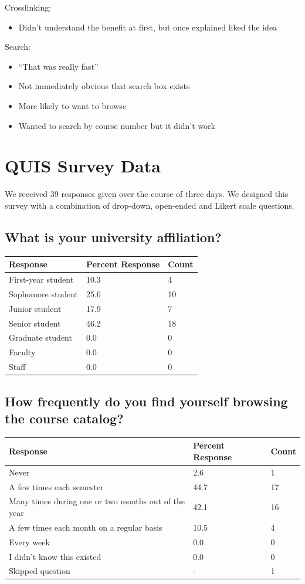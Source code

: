 \documentclass[12pt]{report}
\begin{document}
Crosslinking:
\begin{itemize}
\item Didn't understand the benefit at first, but once explained liked the idea
\end{itemize}
Search:
\begin{itemize}
\item ``That was really fast''
\item Not immediately obvious that search box exists
\item More likely to want to browse
\item Wanted to search by course number but it didn't work
\end{itemize}

\section{QUIS Survey Data}

We received 39 responses given over the course of three days. We designed this survey with a combination of drop-down, open-ended and Likert scale questions.

\subsection*{What is your university affiliation?}

\begin{tabular}{lll}
Response	&Percent Response	&Count \\
\hline
First-year student	&10.3	&4\\
Sophomore student	&25.6	&10\\
Junior student	&17.9	&7\\
Senior student	&46.2	&18\\
Graduate student	&0.0	&0\\
Faculty	&0.0	&0\\
Staff	&0.0	&0\\
\end{tabular}

\subsection*{How frequently do you find yourself browsing the course catalog?}

\begin{tabular}{p{8cm}ll}
Response	&Percent Response	&Count \\
\hline
Never	&2.6	&1\\
A few times each semester	&44.7	&17\\
Many times during one or two months out of the year	&42.1	&16\\
A few times each month on a regular basis	&10.5	&4\\
Every week	&0.0	&0\\
I didn't know this existed	&0.0	&0\\
Skipped question	&-	&1\\
\end{tabular}
\end{document}
